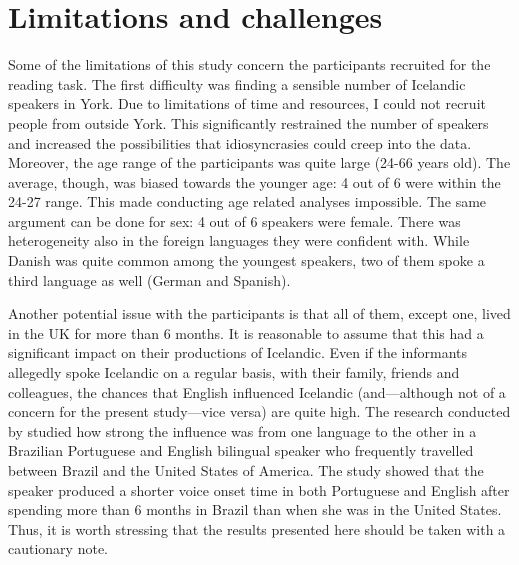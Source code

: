 \documentclass[11pt,a4paper,openany]{memoir}\usepackage[]{graphicx}\usepackage[]{color}
\begin{document}

\section{Limitations and challenges}

Some of the limitations of this study concern the participants recruited for the reading task.
The first difficulty was finding a sensible number of Icelandic speakers in York.
Due to limitations of time and resources, I could not recruit people from outside York.
This significantly restrained the number of speakers and increased the possibilities that idiosyncrasies could creep into the data.
Moreover, the age range of the participants was quite large (24-66 years old).
The average, though, was biased towards the younger age: 4 out of 6 were within the 24-27 range.
This made conducting age related analyses impossible.
The same argument can be done for sex: 4 out of 6 speakers were female.
There was heterogeneity also in the foreign languages they were confident with.
While Danish was quite common among the youngest speakers, two of them spoke a third language as well (German and Spanish).

Another potential issue with the participants is that all of them, except one, lived in the UK for more than 6 months.
It is reasonable to assume that this had a significant impact on their productions of Icelandic.
Even if the informants allegedly spoke Icelandic on a regular basis, with their family, friends and colleagues, the chances that English influenced Icelandic (and---although not of a concern for the present study---vice versa) are quite high.
The research conducted by \citet{sancier1997} studied how strong the influence was from one language to the other in a Brazilian Portuguese and English bilingual speaker who frequently travelled between Brazil and the United States of America.
The study showed that the speaker produced a shorter voice onset time in both Portuguese and English after spending more than 6 months in Brazil than when she was in the United States.
Thus, it is worth stressing that the results presented here should be taken with a cautionary note.
\end{document}
